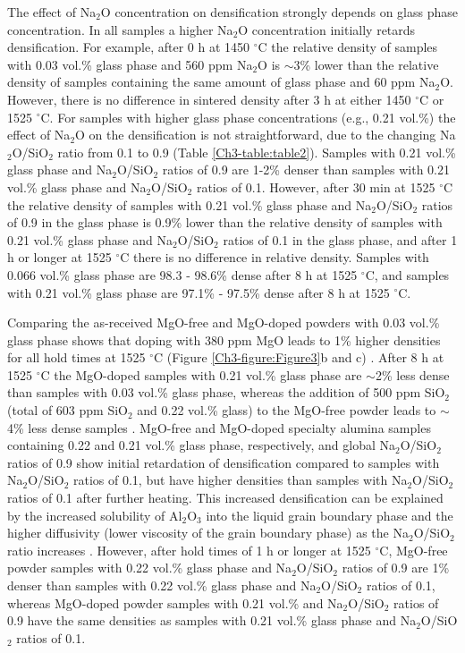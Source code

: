 The effect of Na$_{2}$O concentration on densification strongly depends on glass phase concentration. In all samples a higher Na$_{2}$O concentration initially retards densification. For example, after 0 h at 1450 $^{\circ}$C the relative density of samples with 0.03 vol.\% glass phase and 560 ppm Na$_{2}$O is $\sim$3\% lower than the relative density of samples containing the same amount of glass phase and 60 ppm Na$_{2}$O.  However, there is no difference in sintered density after 3 h at either 1450 $^{\circ}$C or 1525 $^{\circ}$C. For samples with higher glass phase concentrations (e.g., 0.21 vol.\%) the effect of Na$_{2}$O on the densification is not straightforward, due to the changing Na$_{2}$O/SiO$_{2}$ ratio from 0.1 to 0.9 (Table \ref{Ch3-table:table2}). Samples with 0.21 vol.\% glass phase and Na$_{2}$O/SiO$_{2}$ ratios of 0.9 are 1-2\% denser than samples with 0.21 vol.\% glass phase and Na$_{2}$O/SiO$_{2}$ ratios of 0.1. However, after 30 min at 1525 $^{\circ}$C the relative density of samples with 0.21 vol.\% glass phase and Na$_{2}$O/SiO$_{2}$ ratios of 0.9 in the glass phase is 0.9\% lower than the relative density of samples with 0.21 vol.\% glass phase and Na$_{2}$O/SiO$_{2}$ ratios of 0.1 in the glass phase, and after 1 h or longer at 1525 $^{\circ}$C there is no difference in relative density. Samples with 0.066 vol.\% glass phase are 98.3 - 98.6\% dense after 8 h at 1525 $^{\circ}$C, and samples with 0.21 vol.\% glass phase are 97.1\% - 97.5\% dense after 8 h at 1525 $^{\circ}$C. 

Comparing the as-received MgO-free and MgO-doped powders with 0.03 vol.\% glass phase shows that doping with 380 ppm MgO leads to 1\% higher densities for all hold times at 1525 $^{\circ}$C (Figure \ref{Ch3-figure:Figure3}b and c) \cite{Frueh2016}. After 8 h at 1525 $^{\circ}$C the MgO-doped samples with 0.21 vol.\% glass phase are $\sim$2\% less dense than samples with 0.03 vol.\% glass phase, whereas the addition of 500 ppm SiO$_{2}$ (total of 603 ppm SiO$_{2}$ and 0.22 vol.\% glass) to the MgO-free powder leads to $\sim$4\% less dense samples \cite{Frueh2016}. MgO-free and MgO-doped specialty alumina samples containing 0.22 and 0.21 vol.\% glass phase, respectively, and global Na$_{2}$O/SiO$_{2}$ ratios of 0.9 show initial retardation of densification compared to samples with Na$_{2}$O/SiO$_{2}$ ratios of 0.1, but have higher densities than samples with Na$_{2}$O/SiO$_{2}$ ratios of 0.1 after further heating. This increased densification can be explained by the increased solubility of Al$_{2}$O$_{3}$ into the liquid grain boundary phase and the higher diffusivity (lower viscosity of the grain boundary phase) as the Na$_{2}$O/SiO$_{2}$ ratio increases \cite{Frueh2016,Kwon1991}. However, after hold times of 1 h or longer at 1525 $^{\circ}$C, MgO-free powder samples with 0.22 vol.\% glass phase and Na$_{2}$O/SiO$_{2}$ ratios of 0.9 are 1\% denser than samples with 0.22 vol.\% glass phase and Na$_{2}$O/SiO$_{2}$ ratios of 0.1, whereas MgO-doped powder samples with 0.21 vol.\% and Na$_{2}$O/SiO$_{2}$ ratios of 0.9 have the same densities as samples with 0.21 vol.\% glass phase and Na$_{2}$O/SiO$_{2}$ ratios of 0.1. 

